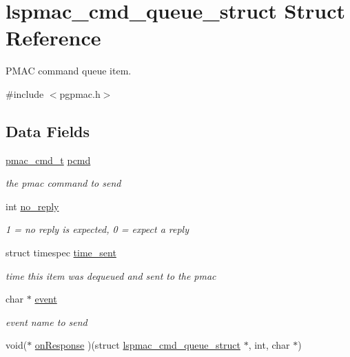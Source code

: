 \hypertarget{structlspmac__cmd__queue__struct}{\section{lspmac\-\_\-cmd\-\_\-queue\-\_\-struct Struct Reference}
\label{structlspmac__cmd__queue__struct}
}


P\-M\-A\-C command queue item.  




{\ttfamily \#include $<$pgpmac.\-h$>$}

\subsection*{Data Fields}
\begin{DoxyCompactItemize}
\item 
\hyperlink{pgpmac_8h_a2d163436571135a457f4a4e2fbd09633}{pmac\-\_\-cmd\-\_\-t} \hyperlink{structlspmac__cmd__queue__struct_a9ac7618bbe0faa3001e8efeb1d89010d}{pcmd}
\begin{DoxyCompactList}\small\item\em the pmac command to send \end{DoxyCompactList}\item 
int \hyperlink{structlspmac__cmd__queue__struct_a33f70b45f8b7c27935cd3efe28748479}{no\-\_\-reply}
\begin{DoxyCompactList}\small\item\em 1 = no reply is expected, 0 = expect a reply \end{DoxyCompactList}\item 
struct timespec \hyperlink{structlspmac__cmd__queue__struct_a276ebc4b35c2554e4cb7377b60fd89b7}{time\-\_\-sent}
\begin{DoxyCompactList}\small\item\em time this item was dequeued and sent to the pmac \end{DoxyCompactList}\item 
char $\ast$ \hyperlink{structlspmac__cmd__queue__struct_ace4d453ad6d6225e910dffb33cde866a}{event}
\begin{DoxyCompactList}\small\item\em event name to send \end{DoxyCompactList}\item 
void($\ast$ \hyperlink{structlspmac__cmd__queue__struct_a08f734865cf7ba341b8666da35ba7d84}{on\-Response} )(struct \hyperlink{structlspmac__cmd__queue__struct}{lspmac\-\_\-cmd\-\_\-queue\-\_\-struct} $\ast$, int, char $\ast$)

\end{DoxyCompactItemize}
